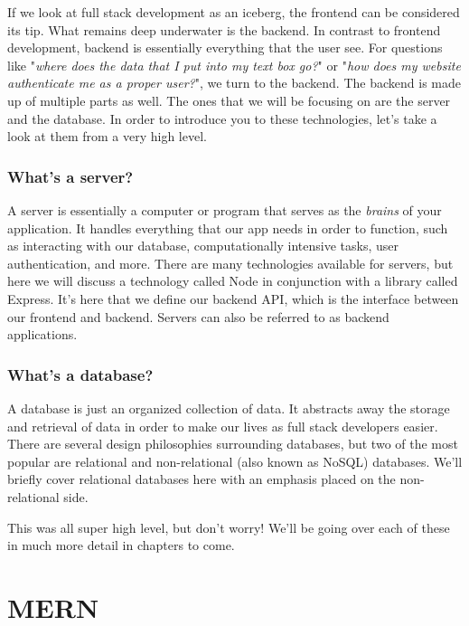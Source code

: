 If we look at full stack development as an iceberg, the frontend can be considered its tip. What remains deep underwater is the backend. In contrast to frontend development, backend is essentially everything that the user  see. For questions like "\emph{where does the data that I put into my text box go?}" or "\emph{how does my website authenticate me as a proper user?}", we turn to the backend. The backend is made up of multiple parts as well. The ones that we will be focusing on are the server and the database. In order to introduce you to these technologies, let's take a look at them from a very high level.

\subsubsection*{What's a server?}

A server is essentially a computer or program that serves as the \emph{brains} of your application. It handles everything that our app needs in order to function, such as interacting with our database, computationally intensive tasks, user authentication, and more. There are many technologies available for servers, but here we will discuss a technology called Node in conjunction with a library called Express.  It's here that we define our backend API, which is the interface between our frontend and backend. Servers can also be referred to as backend applications.

\subsubsection*{What's a database?}

A database is just an organized collection of data. It abstracts away the storage and retrieval of data in order to make our lives as full stack developers easier. There are several design philosophies surrounding databases, but two of the most popular are relational and non-relational (also known as NoSQL) databases. We'll briefly cover relational databases here with an emphasis placed on the non-relational side.

This was all super high level, but don't worry! We'll be going over each of these in much more detail in chapters to come.

\section{MERN}

